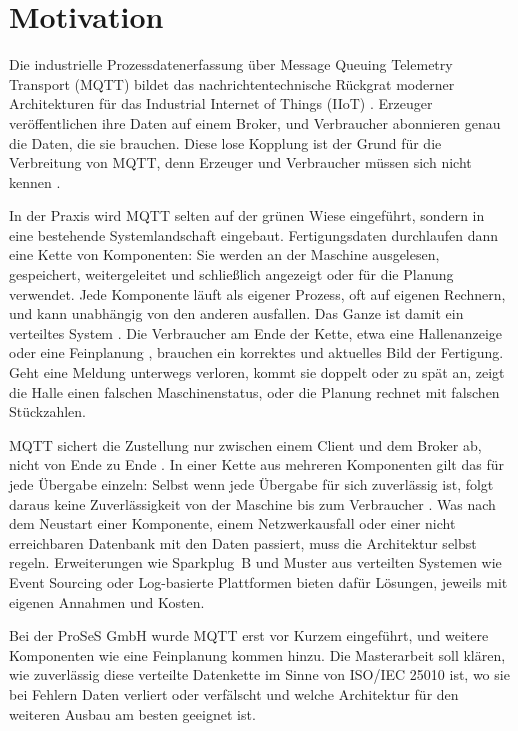 \documentclass[11pt, a4paper]{article}
\begin{document}
\section{Motivation}

Die industrielle Prozessdatenerfassung über Message Queuing Telemetry Transport (MQTT) bildet das nachrichtentechnische Rückgrat moderner Architekturen für das Industrial Internet of Things (IIoT) \cite{mishra2020mqttsurvey}. Erzeuger veröffentlichen ihre Daten auf einem Broker, und Verbraucher abonnieren genau die Daten, die sie brauchen. Diese lose Kopplung ist der Grund für die Verbreitung von MQTT, denn Erzeuger und Verbraucher müssen sich nicht kennen \cite{eugster2003pubsub}.

In der Praxis wird MQTT selten auf der grünen Wiese eingeführt, sondern in eine bestehende Systemlandschaft eingebaut. Fertigungsdaten durchlaufen dann eine Kette von Komponenten: Sie werden an der Maschine ausgelesen, gespeichert, weitergeleitet und schließlich angezeigt oder für die Planung verwendet. Jede Komponente läuft als eigener Prozess, oft auf eigenen Rechnern, und kann unabhängig von den anderen ausfallen. Das Ganze ist damit ein verteiltes System \cite{kleppmann2017ddia}. Die Verbraucher am Ende der Kette, etwa eine Hallenanzeige oder eine Feinplanung \cite{iec62264}, brauchen ein korrektes und aktuelles Bild der Fertigung. Geht eine Meldung unterwegs verloren, kommt sie doppelt oder zu spät an, zeigt die Halle einen falschen Maschinenstatus, oder die Planung rechnet mit falschen Stückzahlen.

MQTT sichert die Zustellung nur zwischen einem Client und dem Broker ab, nicht von Ende zu Ende \cite{mqtt5}. In einer Kette aus mehreren Komponenten gilt das für jede Übergabe einzeln: Selbst wenn jede Übergabe für sich zuverlässig ist, folgt daraus keine Zuverlässigkeit von der Maschine bis zum Verbraucher \cite{saltzer1984endtoend}. Was nach dem Neustart einer Komponente, einem Netzwerkausfall oder einer nicht erreichbaren Datenbank mit den Daten passiert, muss die Architektur selbst regeln. Erweiterungen wie Sparkplug~B \cite{sparkplug3} und Muster aus verteilten Systemen wie Event Sourcing \cite{fowler2005eventsourcing} oder Log-basierte Plattformen \cite{kreps2011kafka} bieten dafür Lösungen, jeweils mit eigenen Annahmen und Kosten.

Bei der ProSeS GmbH wurde MQTT erst vor Kurzem eingeführt, und weitere Komponenten wie eine Feinplanung kommen hinzu. Die Masterarbeit soll klären, wie zuverlässig diese verteilte Datenkette im Sinne von ISO/IEC 25010 \cite{iso25010} ist, wo sie bei Fehlern Daten verliert oder verfälscht und welche Architektur für den weiteren Ausbau am besten geeignet ist.
\end{document}
